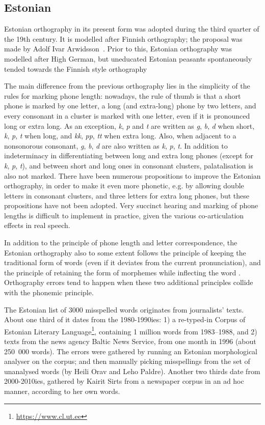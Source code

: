 \documentclass{flammie}
\begin{document}
\subsection{Estonian}

Estonian orthography in its present form was adopted during the third quarter of
the 19th century. It is modelled after Finnish orthography; the proposal was
made by Adolf Ivar Arwidsson~\cite{Arwidsson1822ehstniche}. Prior to this,
Estonian orthography was modelled after High German, but uneducated Estonian
peasants spontaneously tended towards the Finnish style orthography~\cite[p.
204]{Kask1970eesti}

The main difference from the previous orthography lies in the simplicity of the
rules for marking phone length: nowadays, the rule of thumb is that a short
phone is marked by one letter, a long (and extra-long) phone by two letters, and
every consonant in a cluster is marked with one letter, even if it is pronounced
long or extra long. As an exception, \textit{k}, \textit{p} and \textit{t} are
written as \textit{g}, \textit{b}, \textit{d} when short, \textit{k},
\textit{p}, \textit{t} when long, and \textit{kk}, \textit{pp}, \textit{tt} when
extra long. Also, when adjacent to a nonsonorous consonant, \textit{g},
\textit{b}, \textit{d} are also written as \textit{k}, \textit{p}, \textit{t}.
In addition to indeterminacy in differentiating between long and extra long
phones (except for \textit{k}, \textit{p}, \textit{t}), and between short and
long ones in consonant clusters, palatalisation is also not marked. There have
been numerous propositions to improve the Estonian orthography, in order to make
it even more phonetic, e.g. by allowing double letters in consonant clusters,
and three letters for extra long phones, but these propositions have not been
adopted. Very succinct hearing and marking of phone lengths is difficult to
implement in practice, given the various co-articulation effects in real speech.

In addition to the principle of phone length and letter correspondence, the
Estonian orthography also to some extent follows the principle of keeping the
traditional form of words (even if it deviates from the current pronunciation),
and the principle of retaining the form of morphemes while inflecting the word
\cite{EKK}. Orthography errors tend to happen when these two additional
principles collide with the phonemic principle.

The Estonian list of 3000 misspelled words originates from journalists' texts.
About one third of it dates from the 1980-1990ies: 1) a re-typed-in Corpus of
Estonian Literary Language\footnote{\url{https://www.cl.ut.ee}}, containing 1
million words from 1983--1988, and 2) texts from the news agency Baltic News
Service, from one month in 1996 (about 250~000 words). The errors were gathered
by running an Estonian morphological analyser on the corpus; and then manually
picking misspellings from the set of unanalysed words (by Heili Orav and Leho
Paldre). Another two thirds date from 2000-2010ies, gathered by Kairit Sirts
from a newspaper corpus in an ad hoc manner, according to her own words.
\end{document}
